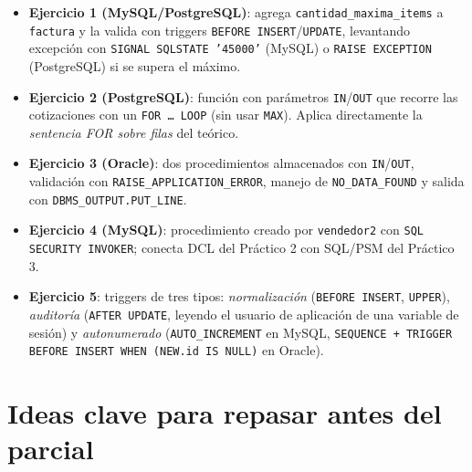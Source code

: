 \documentclass[11pt,a4paper]{article}
\begin{document}
\begin{itemize}
    \item \textbf{Ejercicio 1 (MySQL/PostgreSQL)}: agrega
    \texttt{cantidad\_maxima\_items} a \texttt{factura} y la valida
    con triggers \texttt{BEFORE INSERT}/\texttt{UPDATE}, levantando
    excepción con \texttt{SIGNAL SQLSTATE '45000'} (MySQL) o
    \texttt{RAISE EXCEPTION} (PostgreSQL) si se supera el máximo.
    \item \textbf{Ejercicio 2 (PostgreSQL)}: función con parámetros
    \texttt{IN}/\texttt{OUT} que recorre las cotizaciones con un
    \texttt{FOR \dots\ LOOP} (sin usar \texttt{MAX}). Aplica
    directamente la \emph{sentencia FOR sobre filas} del teórico.
    \item \textbf{Ejercicio 3 (Oracle)}: dos procedimientos
    almacenados con \texttt{IN}/\texttt{OUT}, validación con
    \texttt{RAISE\_APPLICATION\_ERROR}, manejo de
    \texttt{NO\_DATA\_FOUND} y salida con
    \texttt{DBMS\_OUTPUT.PUT\_LINE}.
    \item \textbf{Ejercicio 4 (MySQL)}: procedimiento creado por
    \texttt{vendedor2} con \texttt{SQL SECURITY INVOKER}; conecta
    DCL del Práctico 2 con SQL/PSM del Práctico 3.
    \item \textbf{Ejercicio 5}: triggers de tres tipos:
    \emph{normalización} (\texttt{BEFORE INSERT}, \texttt{UPPER}),
    \emph{auditoría} (\texttt{AFTER UPDATE}, leyendo el usuario de
    aplicación de una variable de sesión) y \emph{autonumerado}
    (\texttt{AUTO\_INCREMENT} en MySQL, \texttt{SEQUENCE + TRIGGER
    BEFORE INSERT WHEN (NEW.id IS NULL)} en Oracle).
\end{itemize}

\section{Ideas clave para repasar antes del parcial}
\end{document}
